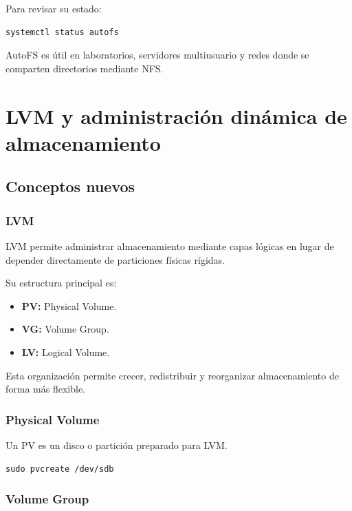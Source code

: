 \documentclass[11pt, letterpaper]{article}
\begin{document}
Para revisar su estado:

\begin{verbatim}
systemctl status autofs
\end{verbatim}

AutoFS es útil en laboratorios, servidores multiusuario y redes donde se comparten directorios mediante NFS.

\newpage
\section{LVM y administración dinámica de almacenamiento}
\label{sec:org29ef1a5}

\subsection{Conceptos nuevos}
\label{sec:org3c2b420}

\subsubsection{LVM}
\label{sec:orge234594}

LVM permite administrar almacenamiento mediante capas lógicas en lugar de depender directamente de particiones físicas rígidas.

Su estructura principal es:

\begin{itemize}
\item \textbf{PV:} Physical Volume.
\item \textbf{VG:} Volume Group.
\item \textbf{LV:} Logical Volume.
\end{itemize}

Esta organización permite crecer, redistribuir y reorganizar almacenamiento de forma más flexible.
\subsubsection{Physical Volume}
\label{sec:orgcb1a241}

Un PV es un disco o partición preparado para LVM.

\begin{verbatim}
sudo pvcreate /dev/sdb
\end{verbatim}
\subsubsection{Volume Group}
\label{sec:org620baba}
\end{document}
